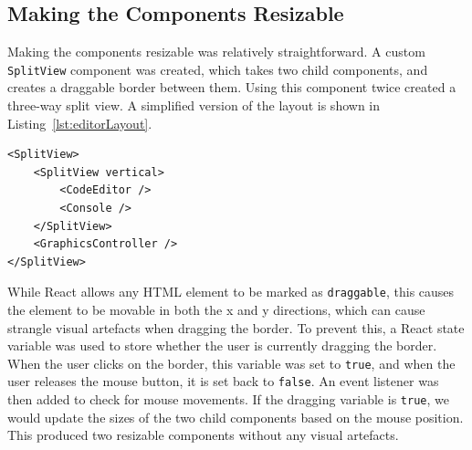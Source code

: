 \documentclass[../main.tex]{subfiles}
\begin{document}
        \subsection{Making the Components Resizable}
            Making the components resizable was relatively straightforward.
            A custom \texttt{SplitView} component was created, which takes two child
                components, and creates a draggable border between them.
            Using this component twice created a three-way split view.
            A simplified version of the layout is shown in Listing~\ref{lst:editorLayout}.

            \begin{lstlisting}[caption={A simplified version of the editor page layout.}, 
                label={lst:editorLayout}]
<SplitView>
    <SplitView vertical>
        <CodeEditor />
        <Console />
    </SplitView>
    <GraphicsController />
</SplitView>\end{lstlisting}

            While React allows any HTML element to be marked as \texttt{draggable}, this
                causes the element to be movable in both the x and y directions, which can
                cause strangle visual artefacts when dragging the border.
            To prevent this, a React state variable was used to store whether the user is
                currently dragging the border.
            When the user clicks on the border, this variable was set to \texttt{true}, and
                when the user releases the mouse button, it is set back to \texttt{false}.
            An event listener was then added to check for mouse movements.
            If the dragging variable is \texttt{true}, we would update the sizes of the two
                child components based on the mouse position.
            This produced two resizable components without any visual artefacts.
\end{document}
